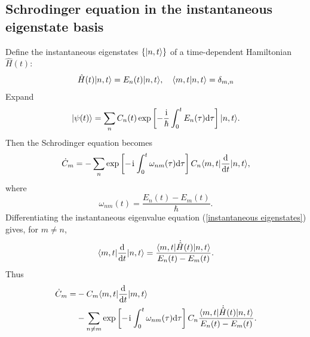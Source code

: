 \subsection{Schrodinger equation in the instantaneous eigenstate basis}
Define the instantaneous eigenstates $\{|{n,t}\rangle\}$ of a time-dependent Hamiltonian $\hat H(t)$:
\begin{equation}\label{instantaneous eigenstates}
\hat H(t)|{n,t}\rangle=E_n(t)|{n,t}\rangle,~~~\langle{m,t|n,t}\rangle=\delta_{m,n}
\end{equation}
Expand
\begin{equation}
|{\psi(t)}\rangle=
\sum_n C_n(t)
\exp\left[-\frac{\hspace{1pt}\mathrm{i}\hspace{1pt}}{\hbar}\int_0^tE_n(\tau)\mathrm{d}\tau\right]
|{n,t}\rangle.
\end{equation}
Then the Schrodinger equation becomes
\begin{equation}
\dot C_m=-\sum_n
\exp\left[-\hspace{1pt}\mathrm{i}\hspace{1pt}\int_0^t\omega_{nm}(\tau)\mathrm{d}\tau\right]
C_n\langle{m,t}|\frac{\mathrm{d}}{\mathrm{d} t}|{n,t}\rangle,
\end{equation}
where
\begin{equation}
\omega_{nm}(t)=\frac{E_n(t)-E_m(t)}{\hbar}.
\end{equation}
Differentiating the instantaneous eigenvalue equation (\ref{instantaneous eigenstates}) gives, for $m\neq n$,
\begin{equation}
\langle{m,t}|\frac{\mathrm{d}}{\mathrm{d} t}|{n,t}\rangle
=\frac{\langle{m,t}|\dot{\hat H}(t)|{n,t}\rangle}
{E_n(t)-E_m(t)}.
\end{equation}
Thus
\begin{align}
\dot C_m
=&-C_m\langle{m,t}|\frac{\mathrm{d}}{\mathrm{d} t}|{m,t}\rangle\nonumber\\
&-\sum_{n\neq m}
\exp\left[-\hspace{1pt}\mathrm{i}\hspace{1pt}\int_0^t\omega_{nm}(\tau)\mathrm{d}\tau\right]
C_n\frac{\langle{m,t}|\dot{\hat H}(t)|{n,t}\rangle}
{E_n(t)-E_m(t)}.
\end{align}

